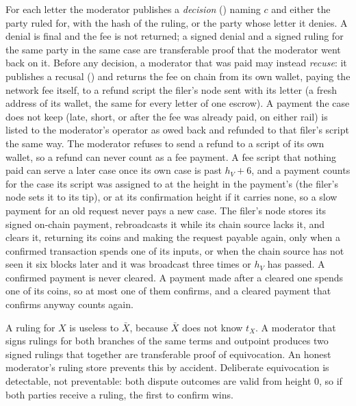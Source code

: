 For each letter the moderator publishes a \emph{decision} () naming $c$ and either the party ruled for, with the hash of the ruling, or the party whose letter it denies. A denial is final and the fee is not returned; a signed denial and a signed ruling for the same party in the same case are transferable proof that the moderator went back on it. Before any decision, a moderator that was paid may instead \emph{recuse}: it publishes a recusal () and returns the fee on chain from its own wallet, paying the network fee itself, to a refund script the filer's node sent with its letter (a fresh address of its wallet, the same for every letter of one escrow). A payment the case does not keep (late, short, or after the fee was already paid, on either rail) is listed to the moderator's operator as owed back and refunded to that filer's script the same way. The moderator refuses to send a refund to a script of its own wallet, so a refund can never count as a fee payment. A fee script that nothing paid can serve a later case once its own case is past $h_V+6$, and a payment counts for the case its script was assigned to at the height in the payment's  (the filer's node sets it to its tip), or at its confirmation height if it carries none, so a slow payment for an old request never pays a new case. The filer's node stores its signed on-chain payment, rebroadcasts it while its chain source lacks it, and clears it, returning its coins and making the request payable again, only when a confirmed transaction spends one of its inputs, or when the chain source has not seen it six blocks later and it was broadcast three times or $h_V$ has passed. A confirmed payment is never cleared. A payment made after a cleared one spends one of its coins, so at most one of them confirms, and a cleared payment that confirms anyway counts again.

A ruling for $X$ is useless to $\bar X$, because $\bar X$ does not know $t_X$. A moderator that signs rulings for both branches of the same terms and outpoint produces two signed rulings that together are transferable proof of equivocation. An honest moderator's ruling store prevents this by accident. Deliberate equivocation is detectable, not preventable: both dispute outcomes are valid from height 0, so if both parties receive a ruling, the first to confirm wins.

